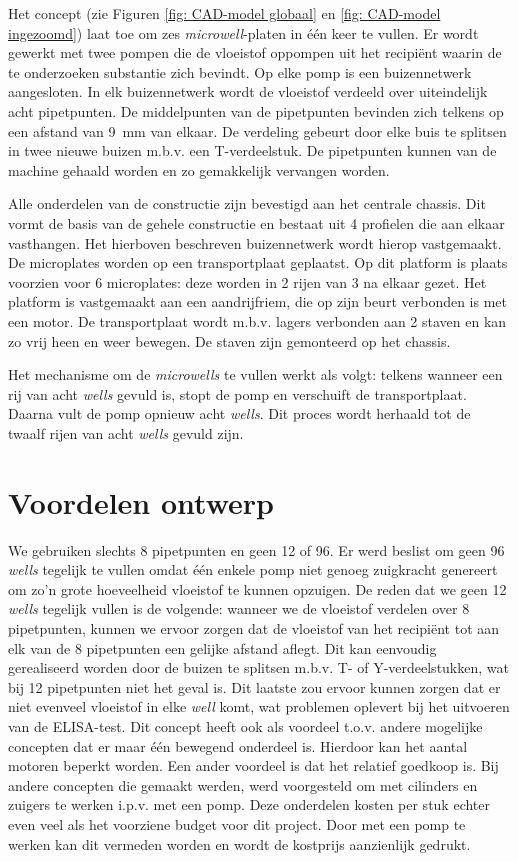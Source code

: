 \documentclass[a4paper,twoside,kulak]{kulakreport} %
\begin{document}
	Het concept (zie Figuren \ref{fig: CAD-model globaal} en \ref{fig: CAD-model ingezoomd}) laat toe om zes \textit{microwell}-platen in één keer te vullen. Er wordt gewerkt met twee pompen die de vloeistof oppompen uit het recipiënt waarin de te onderzoeken substantie zich bevindt. Op elke pomp is een buizennetwerk aangesloten. In elk buizennetwerk wordt de vloeistof verdeeld over uiteindelijk acht pipetpunten. De middelpunten van de pipetpunten bevinden zich telkens op een afstand van \SI{9}{mm} van elkaar. De verdeling gebeurt door elke buis te splitsen in twee nieuwe buizen m.b.v. een T-verdeelstuk. De pipetpunten kunnen van de machine gehaald worden en zo gemakkelijk vervangen worden.
	
	Alle onderdelen van de constructie zijn bevestigd aan het centrale chassis. Dit vormt de basis van de gehele constructie en bestaat uit 4 profielen die aan elkaar vasthangen. Het hierboven beschreven buizennetwerk wordt hierop vastgemaakt.
	De microplates worden op een transportplaat geplaatst. Op dit platform is plaats voorzien voor 6 microplates: deze worden in 2 rijen van 3 na elkaar gezet. Het platform is vastgemaakt aan een aandrijfriem, die op zijn beurt verbonden is met een motor. De transportplaat wordt m.b.v. lagers verbonden aan 2 staven en kan zo vrij heen en weer bewegen. De staven zijn gemonteerd op het chassis.
	
	Het mechanisme om de \textit{microwells} te vullen werkt als volgt: telkens wanneer een rij van acht \textit{wells} gevuld is, stopt de pomp en verschuift de transportplaat. Daarna vult de pomp opnieuw acht \textit{wells}. Dit proces wordt herhaald tot de twaalf rijen van acht \textit{wells} gevuld zijn. 
	
\section{Voordelen ontwerp}
	We gebruiken slechts 8 pipetpunten en geen 12 of 96. Er werd beslist om geen 96 \textit{wells} tegelijk te vullen omdat één enkele pomp niet genoeg zuigkracht genereert om zo'n grote hoeveelheid vloeistof te kunnen opzuigen. De reden dat we geen 12 \textit{wells} tegelijk vullen is de volgende: wanneer we de vloeistof verdelen over 8 pipetpunten, kunnen we ervoor zorgen dat de vloeistof van het recipiënt tot aan elk van de 8 pipetpunten een gelijke afstand aflegt. Dit kan eenvoudig gerealiseerd worden door de buizen te splitsen m.b.v. T- of Y-verdeelstukken, wat bij 12 pipetpunten niet het geval is. Dit laatste zou ervoor kunnen zorgen dat er niet evenveel vloeistof in elke \textit{well} komt, wat problemen oplevert bij het uitvoeren van de ELISA-test. Dit concept heeft ook als voordeel t.o.v. andere mogelijke concepten dat er maar één bewegend onderdeel is. Hierdoor kan het aantal motoren beperkt worden. Een ander voordeel is dat het relatief goedkoop is. Bij andere concepten die gemaakt werden, werd voorgesteld om met cilinders en zuigers te werken i.p.v. met een pomp. Deze onderdelen kosten per stuk echter even veel als het voorziene budget voor dit project. Door met een pomp te werken kan dit vermeden worden en wordt de kostprijs aanzienlijk gedrukt. 
	
\end{document}
